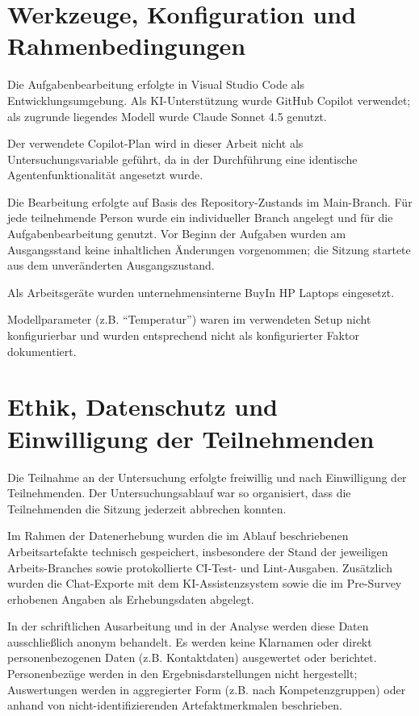\section{Werkzeuge, Konfiguration und Rahmenbedingungen}
Die Aufgabenbearbeitung erfolgte in Visual Studio Code als Entwicklungsumgebung. Als KI-Unterstützung wurde GitHub Copilot verwendet; als zugrunde liegendes Modell wurde Claude Sonnet 4.5 genutzt.

Der verwendete Copilot-Plan wird in dieser Arbeit nicht als Untersuchungsvariable geführt, da in der Durchführung eine identische Agentenfunktionalität angesetzt wurde.

Die Bearbeitung erfolgte auf Basis des Repository-Zustands im Main-Branch. Für jede teilnehmende Person wurde ein individueller Branch angelegt und für die Aufgabenbearbeitung genutzt. Vor Beginn der Aufgaben wurden am Ausgangsstand keine inhaltlichen Änderungen vorgenommen; die Sitzung startete aus dem unveränderten Ausgangszustand.

Als Arbeitsgeräte wurden unternehmensinterne BuyIn HP Laptops eingesetzt.

Modellparameter (z.B. \enquote{Temperatur}) waren im verwendeten Setup nicht konfigurierbar und wurden entsprechend nicht als konfigurierter Faktor dokumentiert.

\section{Ethik, Datenschutz und Einwilligung der Teilnehmenden}
Die Teilnahme an der Untersuchung erfolgte freiwillig und nach Einwilligung der Teilnehmenden. Der Untersuchungsablauf war so organisiert, dass die Teilnehmenden die Sitzung jederzeit abbrechen konnten.

Im Rahmen der Datenerhebung wurden die im Ablauf beschriebenen Arbeitsartefakte technisch gespeichert, insbesondere der Stand der jeweiligen Arbeits-Branches sowie protokollierte CI-Test- und Lint-Ausgaben. Zusätzlich wurden die Chat-Exporte mit dem KI-Assistenzsystem sowie die im Pre-Survey erhobenen Angaben als Erhebungsdaten abgelegt.

In der schriftlichen Ausarbeitung und in der Analyse werden diese Daten ausschließlich anonym behandelt. Es werden keine Klarnamen oder direkt personenbezogenen Daten (z.B. Kontaktdaten) ausgewertet oder berichtet. Personenbezüge werden in den Ergebnisdarstellungen nicht hergestellt; Auswertungen werden in aggregierter Form (z.B. nach Kompetenzgruppen) oder anhand von nicht-identifizierenden Artefaktmerkmalen beschrieben.


